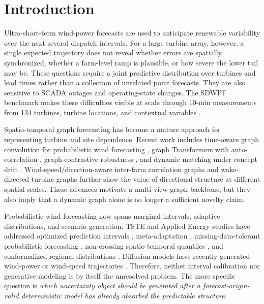 \documentclass[journal]{IEEEtran}
\begin{document}
\section{Introduction}

Ultra-short-term wind-power forecasts are used to anticipate renewable variability over the next several dispatch intervals. For a large turbine array, however, a single expected trajectory does not reveal whether errors are spatially synchronized, whether a farm-level ramp is plausible, or how severe the lower tail may be. These questions require a joint predictive distribution over turbines and lead times rather than a collection of unrelated point forecasts. They are also sensitive to SCADA outages and operating-state changes. The SDWPF benchmark makes these difficulties visible at scale through 10-min measurements from 134 turbines, turbine locations, and contextual variables \cite{zhou2024sdwpf}.

Spatio-temporal graph forecasting has become a mature approach for representing turbine and site dependence. Recent work includes time-aware graph convolution for probabilistic wind forecasting \cite{tang2024timeaware}, graph Transformers with auto-correlation \cite{liang2025wpformer}, graph-contrastive robustness \cite{liu2025graphcontrast}, and dynamic matching under concept drift \cite{li2025dynamic}. Wind-speed/direction-aware inter-farm correlation graphs \cite{wang2025clustergraph} and wake-directed turbine graphs \cite{hou2026wake} further show the value of directional structure at different spatial scales. These advances motivate a multi-view graph backbone, but they also imply that a dynamic graph alone is no longer a sufficient novelty claim.

Probabilistic wind forecasting now spans marginal intervals, adaptive distributions, and scenario generation. TSTE and Applied Energy studies have addressed optimized prediction intervals \cite{chen2024interval}, meta-adaptation \cite{meng2024meta}, missing-data-tolerant probabilistic forecasting \cite{meng2026missing}, non-crossing spatio-temporal quantiles \cite{chen2025noncrossing}, and conformalized regional distributions \cite{jonkers2024conformal}. Diffusion models have recently generated wind-power or wind-speed trajectories \cite{liu2026diffusion,gao2026diffusion,ma2026stgld}. Therefore, neither interval calibration nor generative modeling is by itself the unresolved problem. The more specific question is \emph{which uncertainty object should be generated after a forecast-origin-valid deterministic model has already absorbed the predictable structure}.
\end{document}
